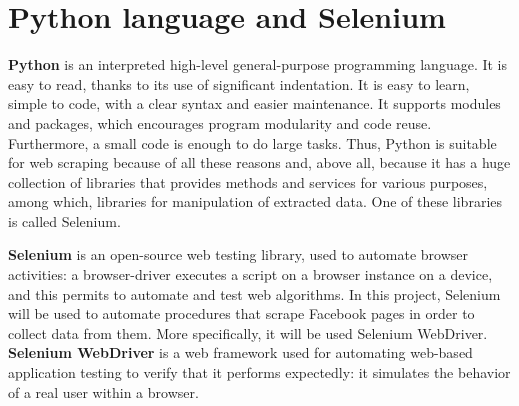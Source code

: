\section{Python language and Selenium}
\textbf{Python}\parencite{site:python} is an interpreted high-level general-purpose programming language. It is easy to read, thanks to its use of significant indentation. It is easy to learn, simple to code, with a clear syntax and easier maintenance. It supports modules and packages, which encourages program modularity and code reuse. Furthermore, a small code is enough to do large tasks. Thus, Python is suitable for web scraping because of all these reasons and, above all, because it has a huge collection of libraries that provides methods and services for various purposes, among which, libraries for manipulation of extracted data. One of these libraries is called Selenium.
\par \noindent \textbf{Selenium}\parencite{site:selenium} is an open-source web testing library, used to automate browser activities: a browser-driver executes a script on a browser instance on a device, and this permits to automate and test web algorithms. In this project, Selenium will be used to automate procedures that scrape Facebook pages in order to collect data from them. More specifically, it will be used Selenium WebDriver. \textbf{Selenium WebDriver}\parencite{site:webdriver} is a web framework used for automating web-based application testing to verify that it performs expectedly: it simulates the behavior of a real user within a browser.	

